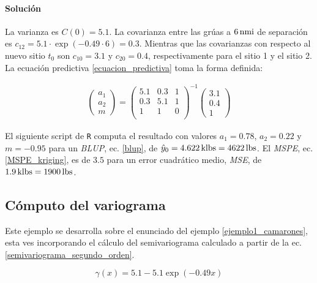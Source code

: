 \documentclass[14pt]{extarticle}
\newenvironment{example}[1][Ejemplo]{\begin{trivlist}
		\item[\hskip \labelsep {\bfseries #1}]}{\end{trivlist}}
\begin{document}
\paragraph{Solución}
La varianza es $C(0) = 5.1$. La covarianza entre las grúas a $\unit[6]{nmi}$ de separación es $c_{12} = 5.1\cdot \exp(-0.49\cdot 6) = 0.3$. Mientras que las covarianzas con respecto al nuevo sitio $t_0$ son $c_{10} = 3.1$ y $c_{20} = 0.4$, respectivamente para el sitio 1 y el sitio 2. La ecuación predictiva \ref{ecuacion_predictiva} toma la forma definida:

\begin{align*}
	\begin{pmatrix}
	a_1 \\ a_2 \\ m 
	\end{pmatrix} = \begin{pmatrix}
	5.1 & 0.3 & 1 \\
	0.3 & 5.1 & 1 \\
	1 & 1 & 0 \\
	\end{pmatrix}^{-1} \begin{pmatrix}
	3.1 \\ 0.4 \\ 1
	\end{pmatrix}
\end{align*}

El siguiente script de \verb|R| computa el resultado con valores $a_1 = 0.78$, $a_2 = 0.22$ y $m = -0.95$ para un \textit{BLUP}, ec. \ref{blup}, de $\hat{y}_0 = \unit[4.622]{klbs} = \unit[4622]{lbs}$. El \textit{MSPE}, ec. \ref{MSPE_kriging}, es de $3.5$ para un error cuadrático medio, \textit{MSE}, de $\unit[1.9]{klbs} = \unit[1900]{lbs}$.



\subsection{Cómputo del variograma}

\begin{example}[Ejemplo 2: Re-evaluado mediante \textit{semivariograma}]
	Este ejemplo se desarrolla sobre el enunciado del ejemplo \ref{ejemplo1_camarones}, esta ves incorporando el cálculo del semivariograma calculado a partir de la ec. \ref{semivariograma_segundo_orden}. 
	
	$$\gamma(x) = 5.1 - 5.1 \exp(-0.49 x)$$
\end{example}
\end{document}
